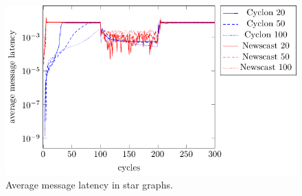 \documentclass[a4paper]{ifacconf}
\begin{document}
\begin{figure}[p]
    \centering
    \includegraphics[width=.9\linewidth]{"figures/average_message_latency/average message latency star"}
    \caption{Average message latency in star graphs.}
    \label{fig:average-message-latency-star}
\end{figure}
\end{document}
